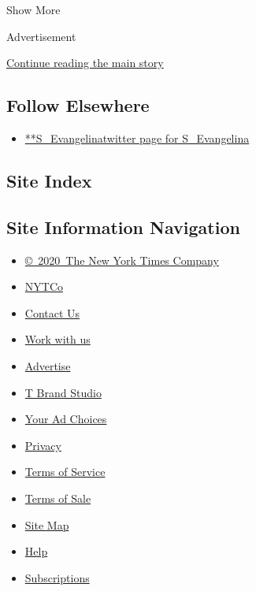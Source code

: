 Show More

Advertisement

\protect\hyperlink{after-mid2}{Continue reading the main story}

\hypertarget{follow-elsewhere}{%
\subsection{Follow Elsewhere}\label{follow-elsewhere}}

\begin{itemize}
\tightlist
\item
  \href{https://twitter.com/S_Evangelina}{**S\_Evangelinatwitter page
  for S\_Evangelina}
\end{itemize}

\hypertarget{site-index}{%
\subsection{Site Index}\label{site-index}}

\hypertarget{site-information-navigation}{%
\subsection{Site Information
Navigation}\label{site-information-navigation}}

\begin{itemize}
\tightlist
\item
  \href{https://help.nytimes.com/hc/en-us/articles/115014792127-Copyright-notice}{©~2020~The
  New York Times Company}
\end{itemize}

\begin{itemize}
\tightlist
\item
  \href{https://www.nytco.com/}{NYTCo}
\item
  \href{https://help.nytimes.com/hc/en-us/articles/115015385887-Contact-Us}{Contact
  Us}
\item
  \href{https://www.nytco.com/careers/}{Work with us}
\item
  \href{https://nytmediakit.com/}{Advertise}
\item
  \href{http://www.tbrandstudio.com/}{T Brand Studio}
\item
  \href{https://www.nytimes.com/privacy/cookie-policy\#how-do-i-manage-trackers}{Your
  Ad Choices}
\item
  \href{https://www.nytimes.com/privacy}{Privacy}
\item
  \href{https://help.nytimes.com/hc/en-us/articles/115014893428-Terms-of-service}{Terms
  of Service}
\item
  \href{https://help.nytimes.com/hc/en-us/articles/115014893968-Terms-of-sale}{Terms
  of Sale}
\item
  \href{https://spiderbites.nytimes.com}{Site Map}
\item
  \href{https://help.nytimes.com/hc/en-us}{Help}
\item
  \href{https://www.nytimes.com/subscription?campaignId=37WXW}{Subscriptions}
\end{itemize}
